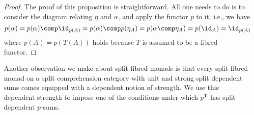 \begin{proof}
The proof of this proposition is straightforward. All one needs to do is to consider the diagram relating $\eta$ and $\alpha$, and apply the functor $p$ to it, i.e., we have
\[
p(\alpha) = p(\alpha) \comp \id_{p(A)} = p(\alpha) \comp p(\eta_A) = p(\alpha \comp \eta_A) = p(\id_A) = \id_{p(A)}
\]
where $p(A) = p(T(A))$ holds because $T$ is assumed to be a fibred functor.
\end{proof}

Another observation we make about split fibred monads is that every split fibred monad on a split comprehension category with unit and strong split dependent sums comes equipped with a dependent notion of strength. 
We use this dependent strength to impose one of the conditions under which $p^{\mathbf{T}}$ has split dependent $p$-sums.

